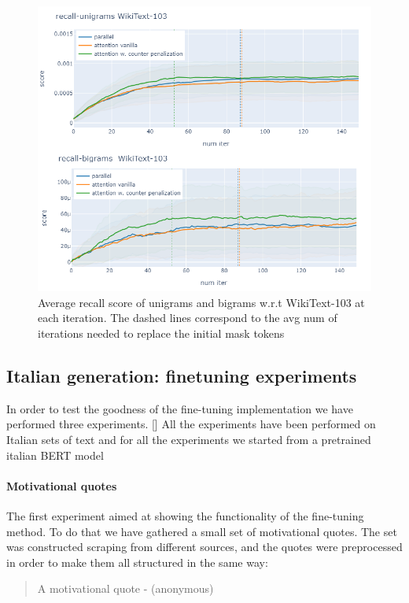 \documentclass[10pt,twocolumn,letterpaper]{article}
\begin{document}
\begin{figure}[t!]
   \centering
   \includegraphics[scale=0.4]{recall.png}
   \caption{Average recall score of unigrams and bigrams w.r.t WikiText-103
   at each iteration. The dashed lines correspond to the avg num of iterations needed
   to replace the initial mask tokens}
   \label{fig:Recall}
\end{figure}

\subsection{Italian generation: finetuning experiments}
In order to test the goodness of the fine-tuning implementation we have performed three experiments. []
All the experiments have been performed on Italian sets of text and for all the experiments we started from a
pretrained italian BERT model

\paragraph{Motivational quotes} The first experiment aimed at showing the functionality of the fine-tuning method.
To do that we have gathered a small set of motivational quotes.
The set was constructed scraping from different sources, and the quotes were preprocessed in order to make them
all structured in the same way:
\begin{quote}
   A motivational quote - (anonymous)
\end{quote}
\end{document}
